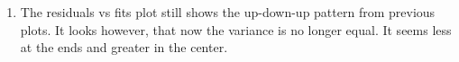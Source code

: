 \documentclass{article}
\providecommand{\tightlist}{%
      \setlength{\itemsep}{0pt}\setlength{\parskip}{0pt}}
\begin{document}
\begin{enumerate}
\def\labelenumi{\alph{enumi})}
\setcounter{enumi}{5}
\tightlist
\item
  The residuals vs fits plot still shows the up-down-up pattern from
  previous plots. It looks however, that now the variance is no longer
  equal. It seems less at the ends and greater in the center.
  
\begin{figure}[!h]
  \begin{floatrow}
  \end{floatrow}
\end{figure}
\end{enumerate}
\end{document}
